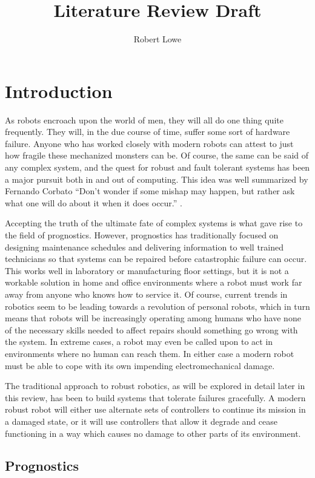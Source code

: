 \documentclass[12pt]{article}
\title{Literature Review Draft}
\author{Robert Lowe}
\begin{document}
\maketitle

\section{Introduction}
As robots encroach upon the world of men, they will all do one thing
quite frequently.  They will, in the due course of time, suffer some
sort of hardware failure.  Anyone who has worked closely with modern
robots can attest to just how fragile these mechanized monsters can
be.  Of course, the same can be said of any complex system, and the
quest for robust and fault tolerant systems has been a major pursuit
both in and out of computing.  This idea was well summarized by
Fernando Corbato ``Don't wonder if some mishap may happen, but rather
ask what one will do about it when it does occur.''  \cite{corbato}.

Accepting the truth of the ultimate fate of complex systems is what
gave rise to the field of prognostics.  However, prognostics has
traditionally focused on designing maintenance schedules and
delivering information to well trained technicians so that systems can
be repaired before catastrophic failure can occur.  This works well in
laboratory or manufacturing floor settings, but it is not a workable
solution in home and office environments where a robot must work far
away from anyone who knows how to service it.  Of course, current
trends in robotics seem to be leading towards a revolution of personal
robots, which in turn means that robots will be increasingly operating
among humans who have none of the necessary skills needed to affect
repairs should something go wrong with the system.  In extreme cases,
a robot may even be called upon to act in environments where no human
can reach them.  In either case a modern robot must be able to cope
with its own impending electromechanical damage.

The traditional approach to robust robotics, as will be explored in
detail later in this review, has been to build systems that tolerate
failures gracefully.  A modern robust robot will either use alternate
sets of controllers to continue its mission in a damaged state, or it
will use controllers that allow it degrade and cease functioning in a
way which causes no damage to other parts of its environment.  



\subsection{Prognostics}
\end{document}
